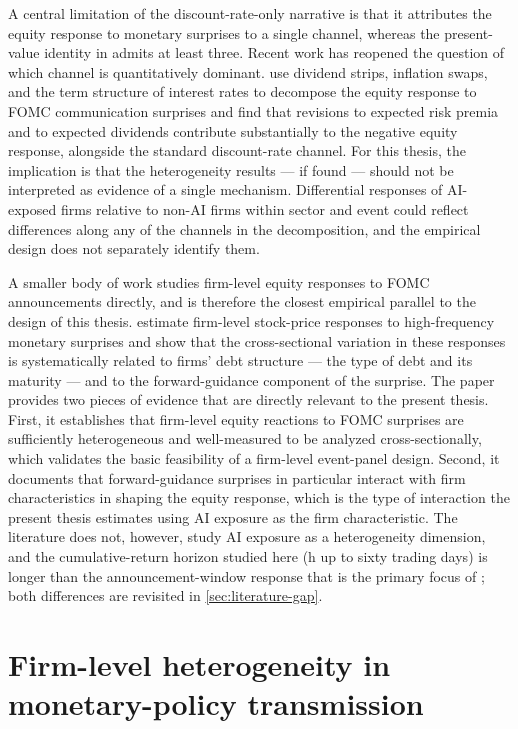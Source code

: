 A central limitation of the discount-rate-only narrative is that it
attributes the equity response to monetary surprises to a single
channel, whereas the present-value identity in \citet{campbellAmmer1993}
admits at least three. Recent work has reopened the question of which
channel is quantitatively dominant.  use dividend
strips, inflation swaps, and the term structure of interest rates to
decompose the equity response to FOMC communication surprises and
find that revisions to expected risk premia and to expected dividends
contribute substantially to the negative equity response, alongside
the standard discount-rate channel. For this thesis, the implication
is that the heterogeneity results --- if found --- should not be
interpreted as evidence of a single mechanism. Differential responses
of AI-exposed firms relative to non-AI firms within sector and event
could reflect differences along any of the channels in the
\citet{campbellAmmer1993} decomposition, and the empirical design does
not separately identify them.

A smaller body of work studies firm-level equity responses to FOMC
announcements directly, and is therefore the closest empirical
parallel to the design of this thesis. 
estimate firm-level stock-price responses to high-frequency monetary
surprises and show that the cross-sectional variation in these
responses is systematically related to firms' debt structure ---
the type of debt and its maturity --- and to the forward-guidance
component of the surprise. The paper provides two pieces of evidence
that are directly relevant to the present thesis. First, it
establishes that firm-level equity reactions to FOMC surprises are
sufficiently heterogeneous and well-measured to be analyzed
cross-sectionally, which validates the basic feasibility of a
firm-level event-panel design. Second, it documents that
forward-guidance surprises in particular interact with firm
characteristics in shaping the equity response, which is the type
of interaction the present thesis estimates using AI exposure as the
firm characteristic. The literature does not, however, study AI
exposure as a heterogeneity dimension, and the cumulative-return
horizon studied here (h up to sixty trading days) is longer than the
announcement-window response that is the primary focus of
\citet{gurkaynakKarasoyCanLee2022}; both differences are revisited in
\cref{sec:literature-gap}.

\section{Firm-level heterogeneity in monetary-policy transmission}
\label{sec:literature-firm-heterogeneity}

